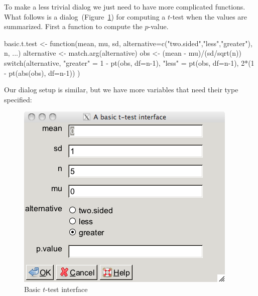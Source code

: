 \documentclass{article}
\begin{document}
To make a less trivial dialog we just need to have more complicated
functions. What follows is a dialog~(Figure~\ref{fig:t-test-1}) for computing a $t$-test when the
values are summarized. First a function to compute the $p$-value.
\begin{Schunk}
\begin{Sinput}
 basic.t.test <- function(mean, mu, sd, alternative=c("two.sided","less","greater"),
                          n, ...) {
   alternative <- match.arg(alternative)
   obs <- (mean - mu)/(sd/sqrt(n))
   switch(alternative,
          "greater" = 1 - pt(obs, df=n-1),
          "less" = pt(obs, df=n-1),
          2*(1 - pt(abs(obs), df=n-1))
          )
 }
\end{Sinput}
\end{Schunk}
Our dialog setup is similar, but we have more variables that need
their type specified:
\begin{Schunk}
\end{Schunk}
 
\begin{figure}
  \centering
  \includegraphics[width=.6\textwidth]{t-test-1}
  \caption{Basic $t$-test interface}
  \label{fig:t-test-1}
\end{figure}
\end{document}
